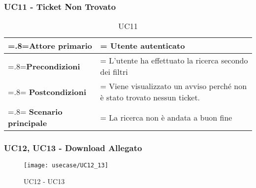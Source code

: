     
  \subsubsection{UC11 - Ticket Non Trovato}              
 \begin{table}[H]
                \centering
                \renewcommand{\arraystretch}{1.8}
                \renewcommand\tabularxcolumn[1]{m{#1}}
                \begin{tabularx}{0.9\textwidth} {
                    >{\hsize=.8\hsize\linewidth=\hsize}X
                    >{\hsize=1.2\hsize\linewidth=\hsize}X}
                    \hline
                    \textbf{Attore primario} & Utente autenticato \\
                    \hline
                    \textbf{Precondizioni} & L'utente ha effettuato la ricerca secondo dei filtri\\
                    \hline
                    \textbf{Postcondizioni} & Viene visualizzato un avviso perché non è stato trovato nessun ticket. \\
                    \hline
                    \textbf{Scenario principale} & La ricerca non è andata a buon fine \\
                    \hline
                   
                \end{tabularx}
                \caption{UC11}
            \end{table}               
                
                
                
\subsubsection{UC12, UC13 - Download Allegato}

\begin{figure}[H]
    \centering 
    \texttt{[image: usecase/UC12\_13]}
    \caption{UC12 - UC13}
\end{figure}

